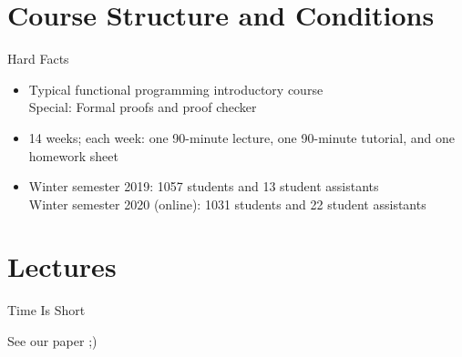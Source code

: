 \documentclass{beamer}
\begin{document}
\section{Course Structure and Conditions}
\begin{frame}{Hard Facts}
\begin{itemize}[<+->]
  \item Typical functional programming introductory course\\
    Special: Formal proofs and proof checker
  \item 14 weeks; each week: one 90-minute lecture, one 90-minute tutorial, and one homework sheet
   \item Winter semester 2019: 1057 students and 13 student assistants\\
     Winter semester 2020 (online): 1031 students and 22 student assistants
\end{itemize}
\end{frame}


\section{Lectures}
\begin{frame}{Time Is Short}
  \centerline{\alert{\Large{See our paper ;)}}}
\end{frame}


\end{document}
